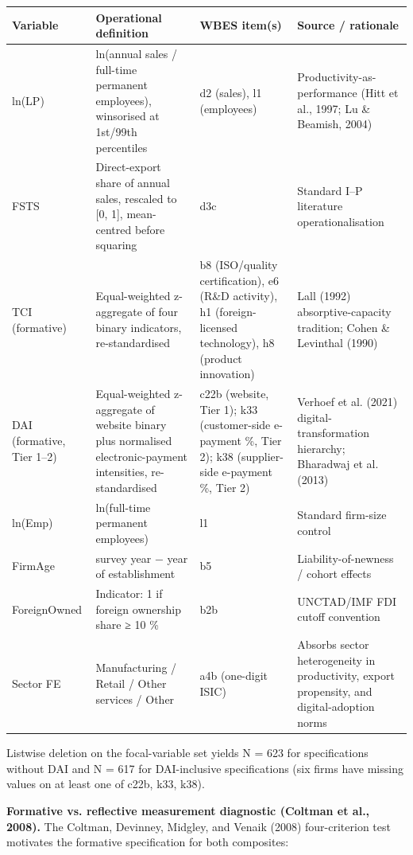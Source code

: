 \documentclass[12pt,a4paper]{article}
\begin{document}
\begin{longtable}[]{@{}llll@{}}
\toprule\noalign{}
Variable & Operational definition & WBES item(s) & Source / rationale \\
\midrule\noalign{}
\endhead
\bottomrule\noalign{}
\endlastfoot
ln(LP) & ln(annual sales / full-time permanent employees), winsorised at
1st/99th percentiles & d2 (sales), l1 (employees) &
Productivity-as-performance (Hitt et al., 1997; Lu \& Beamish, 2004) \\
FSTS & Direct-export share of annual sales, rescaled to {[}0, 1{]},
mean-centred before squaring & d3c & Standard I--P literature
operationalisation \\
TCI (formative) & Equal-weighted z-aggregate of four binary indicators,
re-standardised & b8 (ISO/quality certification), e6 (R\&D activity), h1
(foreign-licensed technology), h8 (product innovation) & Lall (1992)
absorptive-capacity tradition; Cohen \& Levinthal (1990) \\
DAI (formative, Tier 1--2) & Equal-weighted z-aggregate of website
binary plus normalised electronic-payment intensities, re-standardised &
c22b (website, Tier 1); k33 (customer-side e-payment \%, Tier 2); k38
(supplier-side e-payment \%, Tier 2) & Verhoef et al. (2021)
digital-transformation hierarchy; Bharadwaj et al. (2013) \\
ln(Emp) & ln(full-time permanent employees) & l1 & Standard firm-size
control \\
FirmAge & survey year − year of establishment & b5 &
Liability-of-newness / cohort effects \\
ForeignOwned & Indicator: 1 if foreign ownership share ≥ 10 \% & b2b &
UNCTAD/IMF FDI cutoff convention \\
Sector FE & Manufacturing / Retail / Other services / Other & a4b
(one-digit ISIC) & Absorbs sector heterogeneity in productivity, export
propensity, and digital-adoption norms \\
\end{longtable}

Listwise deletion on the focal-variable set yields N = 623 for
specifications without DAI and N = 617 for DAI-inclusive specifications
(six firms have missing values on at least one of c22b, k33, k38).

\textbf{Formative vs. reflective measurement diagnostic (Coltman et al.,
2008).} The Coltman, Devinney, Midgley, and Venaik (2008) four-criterion
test motivates the formative specification for both composites:
\end{document}
